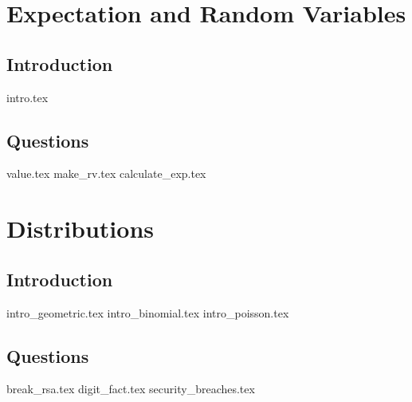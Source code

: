 \documentclass{exam}
\begin{document}
\section{Expectation and Random Variables}
\subsection{Introduction}
{intro.tex}
\subsection{Questions}
\begin{questions}
{value.tex}
{make_rv.tex}
{calculate_exp.tex}
\end{questions}


\section{Distributions}
\subsection{Introduction}
{intro_geometric.tex}
{intro_binomial.tex}
{intro_poisson.tex}
\subsection{Questions}
\begin{questions}
{break_rsa.tex}
{digit_fact.tex}
{security_breaches.tex}
\end{questions}
\end{document}
